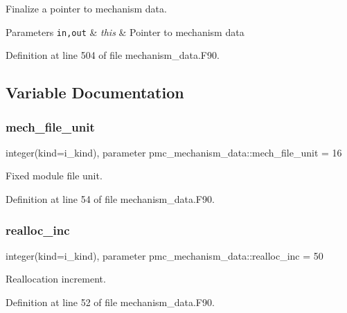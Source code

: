 Finalize a pointer to mechanism data. 


\begin{DoxyParams}[1]{Parameters}
\mbox{\tt in,out}  & {\em this} & Pointer to mechanism data \\
\hline
\end{DoxyParams}


Definition at line 504 of file mechanism\+\_\+data.\+F90.



\subsection{Variable Documentation}
\mbox{\label{namespacepmc__mechanism__data_a93f8a07cd95177a3ace0557137076622}} 
\subsubsection{\texorpdfstring{mech\+\_\+file\+\_\+unit}{mech\_file\_unit}}
{\footnotesize\ttfamily integer(kind=i\+\_\+kind), parameter pmc\+\_\+mechanism\+\_\+data\+::mech\+\_\+file\+\_\+unit = 16\hspace{0.3cm}{\ttfamily [private]}}



Fixed module file unit. 



Definition at line 54 of file mechanism\+\_\+data.\+F90.

\mbox{\label{namespacepmc__mechanism__data_aef2ce48961a795851e8e21d560de452f}} 
\subsubsection{\texorpdfstring{realloc\+\_\+inc}{realloc\_inc}}
{\footnotesize\ttfamily integer(kind=i\+\_\+kind), parameter pmc\+\_\+mechanism\+\_\+data\+::realloc\+\_\+inc = 50\hspace{0.3cm}{\ttfamily [private]}}



Reallocation increment. 



Definition at line 52 of file mechanism\+\_\+data.\+F90.

